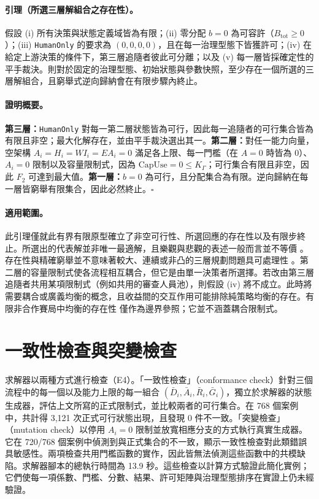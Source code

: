 \paragraph{引理（所選三層解組合之存在性）。}假設 (i) 所有決策與狀態定義域皆為有限；(ii) 零分配 $b=0$ 為可容許（$B_{\mathrm{tot}}\geq0$）；(iii) \texttt{HumanOnly} 的要求為 $(0,0,0,0)$，且在每一治理型態下皆獲許可；(iv) 在給定上游決策的條件下，第三層追隨者彼此可分離；以及 (v) 每一層皆採確定性的平手裁決。則對於固定的治理型態、初始狀態與參數快照，至少存在一個所選的三層解組合，且窮舉式逆向歸納會在有限步驟內終止。

\paragraph{證明概要。}\textbf{第三層：}\texttt{HumanOnly} 對每一第二層狀態皆為可行，因此每一追隨者的可行集合皆為有限且非空；最大化解存在，並由平手裁決選出其一。\textbf{第二層：}對任一能力向量，空架構 $A_i=H_i=WI_i=EA_i=0$ 滿足各上限、每一門檻（在 $A=0$ 時皆為 0）、$A_i=0$ 限制以及容量限制式，因為 $\mathrm{CapUse}=0\leq K_\Gamma$；可行集合有限且非空，因此 $F_2$ 可達到最大值。\textbf{第一層：}$b=0$ 為可行，且分配集合為有限。逆向歸納在每一層皆窮舉有限集合，因此必然終止。$\square$

\paragraph{適用範圍。}此引理僅就此有界有限原型確立了非空可行性、所選回應的存在性以及有限步終止。所選出的代表解並非唯一最適解，且樂觀與悲觀的表述一般而言並不等價 \citep{dempe2002foundations}。存在性與精確窮舉並不意味著較大、連續或非凸的三層規劃問題具可處理性 \citep{jeroslow1985polynomial}。第二層的容量限制式使各流程相互耦合，但它是由單一決策者所選擇。若改由第三層追隨者共用某項限制式（例如共用的審查人員池），則假設 (iv) 將不成立。此時將需要耦合或廣義均衡的概念，且收益間的交互作用可能排除純策略均衡的存在。有限非合作賽局中均衡的存在性 \citep{nash1951noncooperative} 僅作為邊界參照；它並不涵蓋耦合限制式。

\section{一致性檢查與突變檢查}

求解器以兩種方式進行檢查（E4）。「一致性檢查」（conformance check）針對三個流程中的每一個以及能力上限的每一組合 $(\bar D_i,\bar A_i,\bar R_i,\bar G_i)$，獨立於求解器的狀態生成器，評估上文所寫的正式限制式，並比較兩者的可行集合。在 768 個案例中，共計得 3,121 次正式可行狀態出現，且發現 0 件不一致。「突變檢查」（mutation check）以停用 $A_i=0$ 限制並放寬相應分支的方式執行真實生成器。它在 720/768 個案例中偵測到與正式集合的不一致，顯示一致性檢查對此類錯誤具敏感性。兩項檢查共用門檻函數的實作，因此皆無法偵測這些函數中的共模缺陷。求解器腳本的總執行時間為 13.9 秒。這些檢查以計算方式驗證此簡化實例；它們使每一項係數、門檻、分數、結果、許可矩陣與治理型態排序在實證上仍未經驗證。

